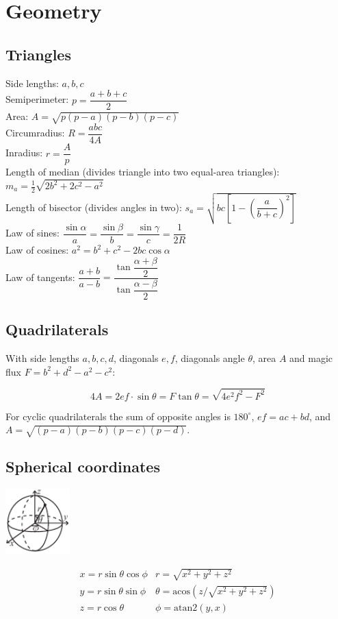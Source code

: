 \section{Geometry}

\subsection{Triangles}
Side lengths: $a,b,c$\\ Semiperimeter: $p=\dfrac{a+b+c}{2}$\\ Area:
$A=\sqrt{p(p-a)(p-b)(p-c)}$\\ Circumradius: $R=\dfrac{abc}{4A}$\\ Inradius:
$r=\dfrac{A}{p}$\\ Length of median (divides triangle into two equal-area
triangles): $m_a=\tfrac{1}{2}\sqrt{2b^2+2c^2-a^2}$\\ Length of bisector
(divides angles in two):
$s_a=\sqrt{bc\left[1-\left(\dfrac{a}{b+c}\right)^2\right]}$\\ Law of sines:
$\dfrac{\sin\alpha}{a}=\dfrac{\sin\beta}{b}=\dfrac{\sin\gamma}{c}=\dfrac{1}{2R}$\\
Law of cosines: $a^2=b^2+c^2-2bc\cos\alpha$\\ Law of tangents:
$\dfrac{a+b}{a-b}=\dfrac{\tan\dfrac{\alpha+\beta}{2}}{\tan\dfrac{\alpha-\beta}{2}}$\\

\subsection{Quadrilaterals}
With side lengths $a,b,c,d$, diagonals $e, f$, diagonals angle $\theta$, area
$A$ and magic flux $F=b^2+d^2-a^2-c^2$:

\[ 4A = 2ef \cdot \sin\theta = F\tan\theta = \sqrt{4e^2f^2-F^2} \]

For cyclic quadrilaterals the sum of opposite angles is $180^\circ$, $ef = ac +
     bd$, and $A = \sqrt{(p-a)(p-b)(p-c)(p-d)}$.

\subsection{Spherical coordinates}
\begin{center}
     \includegraphics[width=25mm]{src/mathematics/spherical-coordinates}
\end{center}
\[\begin{array}{cc}
          x = r\sin\theta\cos\phi & r = \sqrt{x^2+y^2+z^2}                       \\
          y = r\sin\theta\sin\phi & \theta = \textrm{acos}(z/\sqrt{x^2+y^2+z^2}) \\
          z = r\cos\theta         & \phi = \textrm{atan2}(y,x)
     \end{array}\]

